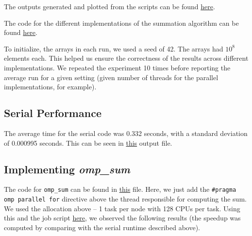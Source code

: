 \documentclass[a4paper,10pt]{article}
\begin{document}
The outputs generated and plotted from the scripts can be found \href{https://github.com/paulmyr/DD2356-MethodsHPC/tree/master/3_open_mp/exercise3/outputs}{here}. 

The code for the different implementations of the summation algorithm can be found \href{https://github.com/paulmyr/DD2356-MethodsHPC/tree/master/3_open_mp/exercise3}{here}.

To initialize, the arrays in each run, we used a seed of 42. The arrays had $10^8$ elements each. This helped us ensure the correctness of the results across different implementations. We repeated the experiment 10 times before reporting the average run for a given setting (given number of threads for the parallel implementations, for example). 

\subsection{Serial Performance}
The average time for the serial code was 0.332 seconds, with a standard deviation of 0.000995 seconds. This can be seen in \href{https://github.com/paulmyr/DD2356-MethodsHPC/blob/master/3_open_mp/exercise3/outputs/serial_output.txt}{this} output file.

\subsection{Implementing \textit{omp\_sum}}
The code for \verb|omp_sum| can be found in \href{https://github.com/paulmyr/DD2356-MethodsHPC/blob/master/3_open_mp/exercise3/omp_sum.c}{this} file. Here, we just add the \verb|#pragma omp parallel for| directive above the thread responsible for computing the sum. We used the allocation above -- 1 task per node with 128 CPUs per task. Using this and the job script \href{https://github.com/paulmyr/DD2356-MethodsHPC/blob/master/3_open_mp/exercise3/job_scripts/omp_sum_job.sh}{here}, we observed the following results (the speedup was computed by comparing with the serial runtime described above). 
\end{document}
